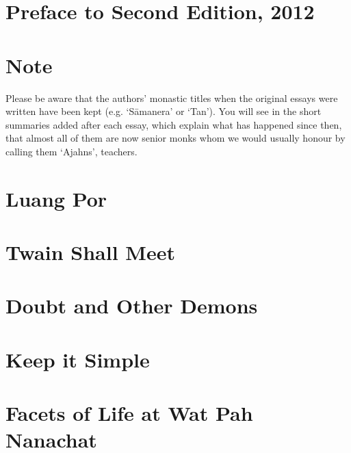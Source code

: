 \documentclass[11pt,twoside,final]{memoir}
\begin{document}


\clearpage


\clearpage


\clearpage
\tableofcontents

\chapter{Preface to Second Edition, 2012}


\chapter{Note}
Please be aware that the authors' monastic titles when the
original essays were written have been kept (e.g. `Sāmanera' or `Tan').
You will see in the short summaries added after each essay, which
explain what has happened since then, that almost all of them are now
senior monks whom we would usually honour by calling them `Ajahns',
teachers.

\chapter{Luang Por}


\chapter{Twain Shall Meet}


\chapter{Doubt and Other Demons}


\chapter{Keep it Simple}


\chapter{Facets of Life at Wat Pah Nanachat}

\end{document}
